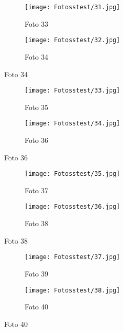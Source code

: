 \documentclass{bachproef-tin}
\begin{document}
\begin{figure}[h]
    \centering
    \begin{subfigure}{0.45\textwidth}
        \centering
        \texttt{[image: Fotosstest/31.jpg]}
        \caption{Foto 33}
    \end{subfigure}%
    \begin{subfigure}{0.45\textwidth}
        \centering
        \texttt{[image: Fotosstest/32.jpg]}
        \caption{Foto 34}
    \end{subfigure}
\end{figure}
\begin{figure}[h]
    \centering
    \begin{subfigure}{0.45\textwidth}
        \centering
        \texttt{[image: Fotosstest/33.jpg]}
        \caption{Foto 35}
    \end{subfigure}%
    \begin{subfigure}{0.45\textwidth}
        \centering
        \texttt{[image: Fotosstest/34.jpg]}
        \caption{Foto 36}
    \end{subfigure}
\end{figure}
\begin{figure}[h]
    \centering
    \begin{subfigure}{0.45\textwidth}
        \centering
        \texttt{[image: Fotosstest/35.jpg]}
        \caption{Foto 37}
    \end{subfigure}%
    \begin{subfigure}{0.45\textwidth}
        \centering
        \texttt{[image: Fotosstest/36.jpg]}
        \caption{Foto 38}
    \end{subfigure}
\end{figure}
\begin{figure}[h]
    \centering
    \begin{subfigure}{0.45\textwidth}
        \centering
        \texttt{[image: Fotosstest/37.jpg]}
        \caption{Foto 39}
    \end{subfigure}%
    \begin{subfigure}{0.45\textwidth}
        \centering
        \texttt{[image: Fotosstest/38.jpg]}
        \caption{Foto 40}
    \end{subfigure}
\end{figure}


\printbibliography[heading=bibintoc]
\end{document}

